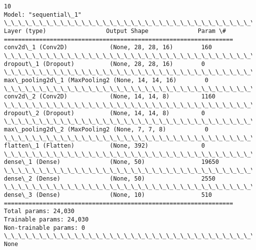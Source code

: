 \documentclass[11pt]{article}
\begin{document}
    \begin{Verbatim}[commandchars=\\\{\}]
10
Model: "sequential\_1"
\_\_\_\_\_\_\_\_\_\_\_\_\_\_\_\_\_\_\_\_\_\_\_\_\_\_\_\_\_\_\_\_\_\_\_\_\_\_\_\_\_\_\_\_\_\_\_\_\_\_\_\_\_\_\_\_\_\_\_\_\_\_\_\_\_
Layer (type)                 Output Shape              Param \#
=================================================================
conv2d\_1 (Conv2D)            (None, 28, 28, 16)        160
\_\_\_\_\_\_\_\_\_\_\_\_\_\_\_\_\_\_\_\_\_\_\_\_\_\_\_\_\_\_\_\_\_\_\_\_\_\_\_\_\_\_\_\_\_\_\_\_\_\_\_\_\_\_\_\_\_\_\_\_\_\_\_\_\_
dropout\_1 (Dropout)          (None, 28, 28, 16)        0
\_\_\_\_\_\_\_\_\_\_\_\_\_\_\_\_\_\_\_\_\_\_\_\_\_\_\_\_\_\_\_\_\_\_\_\_\_\_\_\_\_\_\_\_\_\_\_\_\_\_\_\_\_\_\_\_\_\_\_\_\_\_\_\_\_
max\_pooling2d\_1 (MaxPooling2 (None, 14, 14, 16)        0
\_\_\_\_\_\_\_\_\_\_\_\_\_\_\_\_\_\_\_\_\_\_\_\_\_\_\_\_\_\_\_\_\_\_\_\_\_\_\_\_\_\_\_\_\_\_\_\_\_\_\_\_\_\_\_\_\_\_\_\_\_\_\_\_\_
conv2d\_2 (Conv2D)            (None, 14, 14, 8)         1160
\_\_\_\_\_\_\_\_\_\_\_\_\_\_\_\_\_\_\_\_\_\_\_\_\_\_\_\_\_\_\_\_\_\_\_\_\_\_\_\_\_\_\_\_\_\_\_\_\_\_\_\_\_\_\_\_\_\_\_\_\_\_\_\_\_
dropout\_2 (Dropout)          (None, 14, 14, 8)         0
\_\_\_\_\_\_\_\_\_\_\_\_\_\_\_\_\_\_\_\_\_\_\_\_\_\_\_\_\_\_\_\_\_\_\_\_\_\_\_\_\_\_\_\_\_\_\_\_\_\_\_\_\_\_\_\_\_\_\_\_\_\_\_\_\_
max\_pooling2d\_2 (MaxPooling2 (None, 7, 7, 8)           0
\_\_\_\_\_\_\_\_\_\_\_\_\_\_\_\_\_\_\_\_\_\_\_\_\_\_\_\_\_\_\_\_\_\_\_\_\_\_\_\_\_\_\_\_\_\_\_\_\_\_\_\_\_\_\_\_\_\_\_\_\_\_\_\_\_
flatten\_1 (Flatten)          (None, 392)               0
\_\_\_\_\_\_\_\_\_\_\_\_\_\_\_\_\_\_\_\_\_\_\_\_\_\_\_\_\_\_\_\_\_\_\_\_\_\_\_\_\_\_\_\_\_\_\_\_\_\_\_\_\_\_\_\_\_\_\_\_\_\_\_\_\_
dense\_1 (Dense)              (None, 50)                19650
\_\_\_\_\_\_\_\_\_\_\_\_\_\_\_\_\_\_\_\_\_\_\_\_\_\_\_\_\_\_\_\_\_\_\_\_\_\_\_\_\_\_\_\_\_\_\_\_\_\_\_\_\_\_\_\_\_\_\_\_\_\_\_\_\_
dense\_2 (Dense)              (None, 50)                2550
\_\_\_\_\_\_\_\_\_\_\_\_\_\_\_\_\_\_\_\_\_\_\_\_\_\_\_\_\_\_\_\_\_\_\_\_\_\_\_\_\_\_\_\_\_\_\_\_\_\_\_\_\_\_\_\_\_\_\_\_\_\_\_\_\_
dense\_3 (Dense)              (None, 10)                510
=================================================================
Total params: 24,030
Trainable params: 24,030
Non-trainable params: 0
\_\_\_\_\_\_\_\_\_\_\_\_\_\_\_\_\_\_\_\_\_\_\_\_\_\_\_\_\_\_\_\_\_\_\_\_\_\_\_\_\_\_\_\_\_\_\_\_\_\_\_\_\_\_\_\_\_\_\_\_\_\_\_\_\_
None
\end{Verbatim}
\end{document}
